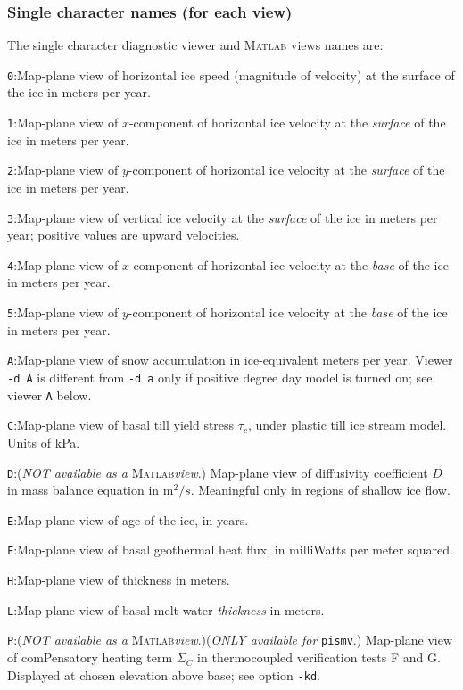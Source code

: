 \documentclass[11pt,final]{amsart}
\renewcommand{\t}[1]{\texttt{#1}}
\newcommand{\Matlab}{\textsc{Matlab}\xspace}
\begin{document}
\subsubsection*{Single character names (for each view)}  The single character diagnostic viewer and \Matlab views names are:
\newcommand{\notMat}{(\emph{NOT available as a} \Matlab \emph{view}.)\xspace\xspace}

\verb|0|:\quad Map-plane view of horizontal ice speed (magnitude of velocity) at the surface of the ice in meters per year.

\verb|1|:\quad Map-plane view of $x$-component of horizontal ice velocity at the \emph{surface} of the ice in meters per year.

\verb|2|:\quad Map-plane view of $y$-component of horizontal ice velocity at the \emph{surface} of the ice in meters per year.

\verb|3|:\quad Map-plane view of vertical ice velocity at the \emph{surface} of the ice in meters per year; positive values are upward velocities.

\verb|4|:\quad Map-plane view of $x$-component of horizontal ice velocity at the \emph{base} of the ice in meters per year.

\verb|5|:\quad Map-plane view of $y$-component of horizontal ice velocity at the \emph{base} of the ice in meters per year.

\verb|A|:\quad Map-plane view of snow accumulation in ice-equivalent meters per year.  Viewer \verb|-d A| is different from \verb|-d a| only if positive degree day model is turned on; see viewer \verb|A| below.

\verb|C|:\quad Map-plane view of basal till yield stress $\tau_c$, under plastic till ice stream model.  Units of kPa.

\verb|D|:\quad \notMat Map-plane view of diffusivity coefficient $D$ in mass balance equation in $\text{m}^2/s$.  Meaningful only in regions of shallow ice flow.

\verb|E|:\quad Map-plane view of age of the ice, in years.

\verb|F|:\quad Map-plane view of basal geothermal heat flux, in milliWatts per meter squared.

\verb|H|:\quad Map-plane view of thickness in meters.

\verb|L|:\quad Map-plane view of basal melt water \emph{thickness} in meters.

\verb|P|:\quad \notMat (\emph{ONLY available for }\t{pismv}.)  Map-plane view of comPensatory heating term $\Sigma_C$ in thermocoupled verification tests F and G.  Displayed at chosen elevation above base; see option \verb|-kd|.
\end{document}
